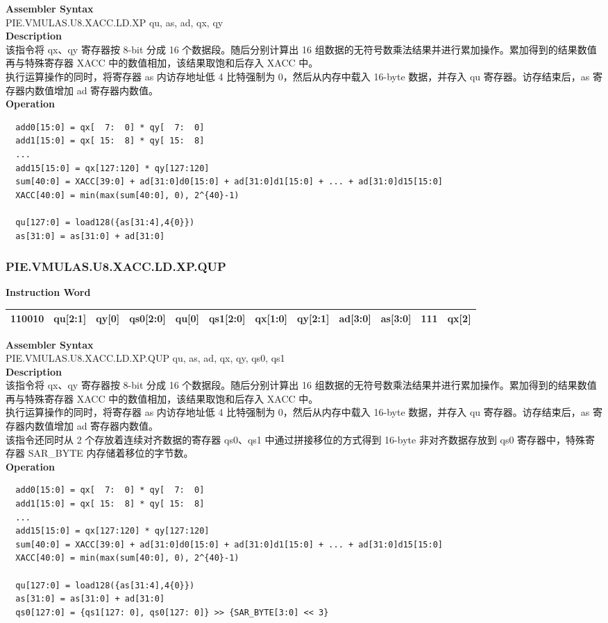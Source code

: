 \textbf{Assembler Syntax} \\
PIE.VMULAS.U8.XACC.LD.XP qu, as, ad, qx, qy \\
\textbf{Description} \\
该指令将 qx、qy 寄存器按 8-bit 分成 16 个数据段。随后分别计算出 16 组数据的无符号数乘法结果并进行累加操作。累加得到的结果数值再与特殊寄存器 XACC 中的数值相加，该结果取饱和后存入 XACC 中。\\
执行运算操作的同时，将寄存器 as 内访存地址低 4 比特强制为 0，然后从内存中载入 16-byte 数据，并存入 qu 寄存器。访存结束后，as 寄存器内数值增加 ad 寄存器内数值。\\
\textbf{Operation}
\begin{lstlisting}
  add0[15:0] = qx[  7:  0] * qy[  7:  0]
  add1[15:0] = qx[ 15:  8] * qy[ 15:  8]
  ...
  add15[15:0] = qx[127:120] * qy[127:120]
  sum[40:0] = XACC[39:0] + ad[31:0]d0[15:0] + ad[31:0]d1[15:0] + ... + ad[31:0]d15[15:0]
  XACC[40:0] = min(max(sum[40:0], 0), 2^{40}-1)

  qu[127:0] = load128({as[31:4],4{0}})
  as[31:0] = as[31:0] + ad[31:0]
\end{lstlisting}

\newpage
\subsubsection{PIE.VMULAS.U8.XACC.LD.XP.QUP}\label{instruction:PIEVMULASU8XACCLDXPQUP}
\setlength\tabcolsep{6pt}
\textbf{Instruction Word} \\
\begin{tabular}{|c|c|c|c|c|c|c|c|c|c|c|c|}
	\hline
	110010 & qu[2:1] & qy[0] & qs0[2:0] & qu[0] & qs1[2:0] & qx[1:0] & qy[2:1] & ad[3:0] & as[3:0] & 111 & qx[2] \\
	\hline
\end{tabular}

\textbf{Assembler Syntax} \\
PIE.VMULAS.U8.XACC.LD.XP.QUP qu, as, ad, qx, qy, qs0, qs1 \\
\textbf{Description} \\
该指令将 qx、qy 寄存器按 8-bit 分成 16 个数据段。随后分别计算出 16 组数据的无符号数乘法结果并进行累加操作。累加得到的结果数值再与特殊寄存器 XACC 中的数值相加，该结果取饱和后存入 XACC 中。\\
执行运算操作的同时，将寄存器 as 内访存地址低 4 比特强制为 0，然后从内存中载入 16-byte 数据，并存入 qu 寄存器。访存结束后，as 寄存器内数值增加 ad 寄存器内数值。\\
该指令还同时从 2 个存放着连续对齐数据的寄存器 qs0、qs1 中通过拼接移位的方式得到 16-byte 非对齐数据存放到 qs0 寄存器中，特殊寄存器 SAR\_BYTE 内存储着移位的字节数。\\
\textbf{Operation}
\begin{lstlisting}
  add0[15:0] = qx[  7:  0] * qy[  7:  0]
  add1[15:0] = qx[ 15:  8] * qy[ 15:  8]
  ...
  add15[15:0] = qx[127:120] * qy[127:120]
  sum[40:0] = XACC[39:0] + ad[31:0]d0[15:0] + ad[31:0]d1[15:0] + ... + ad[31:0]d15[15:0]
  XACC[40:0] = min(max(sum[40:0], 0), 2^{40}-1)

  qu[127:0] = load128({as[31:4],4{0}})
  as[31:0] = as[31:0] + ad[31:0]
  qs0[127:0] = {qs1[127: 0], qs0[127: 0]} >> {SAR_BYTE[3:0] << 3}
\end{lstlisting}

